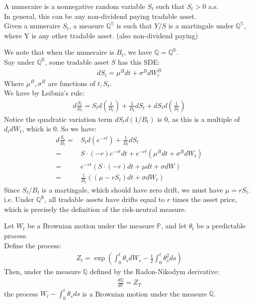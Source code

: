 \begin{definition}
    A numeraire is a nonnegative random variable $S_t$ such that $S_t > 0$ a.s. \\
    In general, this can be any non-dividend paying tradable asset.\\
    Given a numeraire $S_t$, a measure $\mathbb{Q^S}$ is such that
    $Y/S$ is a martingale under $\mathbb{Q^S}$, where Y is any other tradable asset.
    (also non-dividend paying)
\end{definition}
We note that when the numeraire is $B_t$, we have $\mathbb{Q} = \mathbb{Q^B}$.\\
Say under $\mathbb{Q^B}$, some tradable asset $S$ has this SDE:
\begin{align*}
    dS_t = \mu^B dt + \sigma^B dW_t^B
\end{align*}
Where $\mu^B, \sigma^B$ are functions of $t, S_t$.\\
We have by Leibniz's rule:
\begin{align*}
    d\frac{S_t}{B_t} = S_t d(\frac{1}{B_t}) + \frac{1}{B_t} dS_t + dS_t d(\frac{1}{B_t})
\end{align*}
Notice the quadratic variation term $dS_t d(1/B_t)$ is 0, 
as this is a multiple of $ d_t dW_t $, which is 0. So we have:
\begin{align*}
    d\frac{S_t}{B_t} =& S_t d(e^{-rt}) + \frac{1}{B_t} dS_t \\
    =& S \cdot (-r) e^{-rt} dt + e^{-rt}  \left( \mu^B dt + \sigma^B dW_t \right)\\
    =& e^{-rt} \left( S \cdot (-r) dt +  \mu dt + \sigma dW \right) \\
    =& \frac{1}{B_t} \left( \left( \mu - r S_t \right) dt + \sigma dW_t \right)
\end{align*}
Since $S_t/B_t$ is a martingale, which should have zero drift, we must have $ \mu = r S_t $.\\
i.e. Under $\mathbb{Q^B}$, 
all tradable assets have drifts equal to $r$ times the asset price,
which is precisely the definition of the risk-neutral measure.\\


\begin{theorem}
Let $W_t$ be a Brownian motion under the measure $\mathbb{P}$, and let $\theta_t$ be a predictable process.\\
Define the process:
\begin{align*}
    Z_t = \exp\left(\int_0^t \theta_s dW_s - \frac{1}{2} \int_0^t \theta_s^2 ds\right)
\end{align*}
Then, under the measure $\mathbb{Q}$ defined by the Radon-Nikodym derivative:
\begin{align*}
    \frac{d\mathbb{Q}}{d\mathbb{P}} = Z_T
\end{align*}
the process $W_t - \int_0^t \theta_s ds$ is a Brownian motion under the measure $\mathbb{Q}$.
    
\end{theorem}

